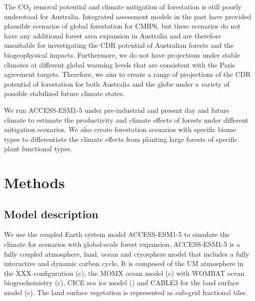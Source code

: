 \documentclass[]{article}
\begin{document}
The CO$_2$ removal potential and climate mitigation of forestation is still poorly understood for Australia.
Integrated assessment models in the past have provided plausible scenarios of global forestation for CMIP6, but these scenarios do not have any additional forest area expansion in Australia \parencite{loughran_limited_2023} and are therefore unsuitable for investigating the CDR potential of Australian forests and the biogeophysical impacts.
Furthermore, we do not have projections under stable climates at different global warming levels that are consistent with the Paris agreement targets.
Therefore, we aim to create a range of projections of the CDR potential of forestation for both Australia and the globe under a variety of possible stabilized future climate states.

We run ACCESS-ESM1-5 under pre-industrial and present day and future climate to estimate the productivity and climate effects of forests under different mitigation scenarios.
We also create forestation scenarios with specific biome types to differentiate the climate effects from planting large forests of specific plant functional types.

\section{Methods}

\subsection{Model description}

We use the coupled Earth system model ACCESS-ESM1-5 to simulate the climate for scenarios with global-scale forest expansion.
ACCESS-ESM1-5 is a fully coupled atmosphere, land, ocean and cryosphere model that includes a fully interactive and dynamic carbon cycle.
It is composed of the UM atmosphere in the XXX configuration (c), the MOMX ocean model (c) with WOMBAT ocean biogeochemistry (c), CICE sea ice model () and CABLE3 for the land surface model (c).
The land surface vegetation is represented as sub-grid fractional tiles.
\end{document}
